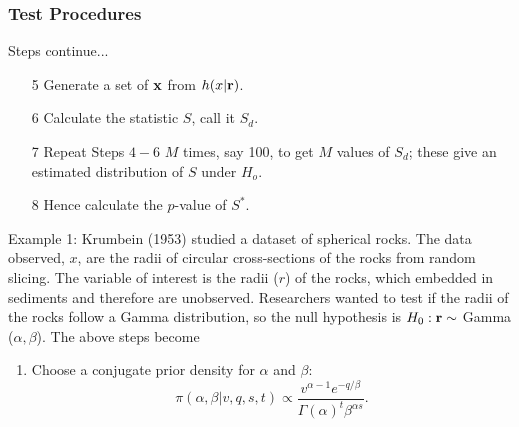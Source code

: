 \documentclass{beamer}
\newcounter{saveenumi}
\newcommand{\seti}{\setcounter{saveenumi}{\value{enumi}}}
\begin{document}
 \frame
{
  \frametitle{Test Procedures}
  Steps continue...
\begin{itemize}
\item[5]
 Generate 
a set of $\bold{x}$ from $h(x|\bold{r})$. 
\item[6]
Calculate 
the statistic $S$, call it $S_d$. 



\item[7]
Repeat Steps $4-6$  $M$ times, say 100, 
to get 
$M$ values of $S_d$; these give 
an estimated 
distribution of $S$ under $H_o$.
\item[8]
Hence calculate the 
$p$-value of $S^*$.
\end{itemize}

Example 1: Krumbein (1953) studied a dataset of spherical rocks. 
 The data observed, $x$, are the radii of circular
 cross-sections of the rocks from random slicing. 
 The variable of interest is the radii ($r$) of the rocks, which 
embedded in sediments and therefore are unobserved.
Researchers wanted to test if the radii of the rocks follow a Gamma distribution, so the null hypothesis is
$H_0: \bold{r} \sim $ Gamma ($\alpha, \beta$). 
The above steps become
 \vspace{-0.2cm}
 \begin{enumerate}
\item
Choose a conjugate prior density for $\alpha$ and $\beta$:
 \begin{equation*}
 \pi(\alpha, \beta| v, q, s, t)\propto \frac{v^{\alpha-1}e^{-q/\beta}}
 {\Gamma(\alpha)^t\beta^{\alpha s}}.
  \end{equation*}

 \seti
 \end{enumerate}
}
  
\end{document}
